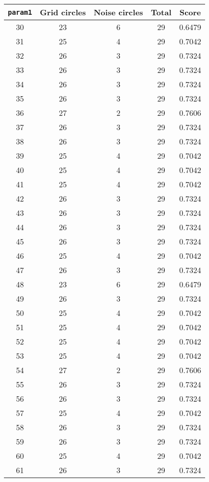 \documentclass[letterpaper, 12pt]{article}
\begin{document}
\begin{longtable}{|c|c|c|c|c|}
\hline
\textbf{\texttt{param1}} & \textbf{Grid circles} & \textbf{Noise circles} & \textbf{Total} & \textbf{Score} \\
\hline
30 & 23 & 6 & 29 & 0.6479 \\
\hline
31 & 25 & 4 & 29 & 0.7042 \\
\hline
32 & 26 & 3 & 29 & 0.7324 \\
\hline
33 & 26 & 3 & 29 & 0.7324 \\
\hline
34 & 26 & 3 & 29 & 0.7324 \\
\hline
35 & 26 & 3 & 29 & 0.7324 \\
\hline
36 & 27 & 2 & 29 & 0.7606 \\
\hline
37 & 26 & 3 & 29 & 0.7324 \\
\hline
38 & 26 & 3 & 29 & 0.7324 \\
\hline
39 & 25 & 4 & 29 & 0.7042 \\
\hline
40 & 25 & 4 & 29 & 0.7042 \\
\hline
41 & 25 & 4 & 29 & 0.7042 \\
\hline
42 & 26 & 3 & 29 & 0.7324 \\
\hline
43 & 26 & 3 & 29 & 0.7324 \\
\hline
44 & 26 & 3 & 29 & 0.7324 \\
\hline
45 & 26 & 3 & 29 & 0.7324 \\
\hline
46 & 25 & 4 & 29 & 0.7042 \\
\hline
47 & 26 & 3 & 29 & 0.7324 \\
\hline
48 & 23 & 6 & 29 & 0.6479 \\
\hline
49 & 26 & 3 & 29 & 0.7324 \\
\hline
50 & 25 & 4 & 29 & 0.7042 \\
\hline
51 & 25 & 4 & 29 & 0.7042 \\
\hline
52 & 25 & 4 & 29 & 0.7042 \\
\hline
53 & 25 & 4 & 29 & 0.7042 \\
\hline
54 & 27 & 2 & 29 & 0.7606 \\
\hline
55 & 26 & 3 & 29 & 0.7324 \\
\hline
56 & 26 & 3 & 29 & 0.7324 \\
\hline
57 & 25 & 4 & 29 & 0.7042 \\
\hline
58 & 26 & 3 & 29 & 0.7324 \\
\hline
59 & 26 & 3 & 29 & 0.7324 \\
\hline
60 & 25 & 4 & 29 & 0.7042 \\
\hline
61 & 26 & 3 & 29 & 0.7324 \\

\end{longtable}
\end{document}
